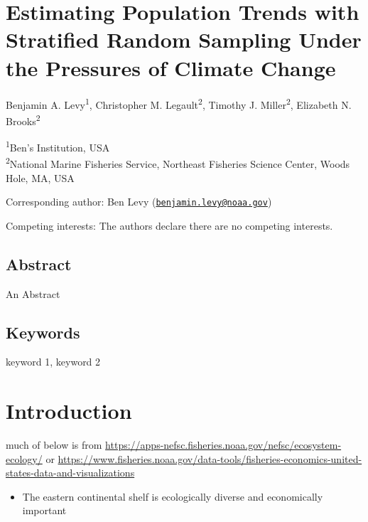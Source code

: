 \documentclass[
  12pt,
]{article}
\author{}
\date{\vspace{-2.5em}}
\providecommand{\tightlist}{%
  \setlength{\itemsep}{0pt}\setlength{\parskip}{0pt}}
\begin{document}
\newpage

\hypertarget{estimating-population-trends-with-stratified-random-sampling-under-the-pressures-of-climate-change}{%
\section{Estimating Population Trends with Stratified Random Sampling Under the Pressures of Climate Change}\label{estimating-population-trends-with-stratified-random-sampling-under-the-pressures-of-climate-change}}

Benjamin A. Levy\textsuperscript{1}, Christopher M. Legault\textsuperscript{2}, Timothy J. Miller\textsuperscript{2}, Elizabeth N. Brooks\textsuperscript{2}

\textsuperscript{1}Ben's Institution, USA\\
\textsuperscript{2}National Marine Fisheries Service, Northeast Fisheries Science Center, Woods Hole, MA, USA

Corresponding author: Ben Levy (\href{mailto:benjamin.levy@noaa.gov}{\nolinkurl{benjamin.levy@noaa.gov}})

Competing interests: The authors declare there are no competing interests.

\newpage

\hypertarget{abstract}{%
\subsection{Abstract}\label{abstract}}

An Abstract

\hypertarget{keywords}{%
\subsection{Keywords}\label{keywords}}

keyword 1, keyword 2

\newpage

\section{Introduction}

much of below is from \url{https://apps-nefsc.fisheries.noaa.gov/nefsc/ecosystem-ecology/}
or
\url{https://www.fisheries.noaa.gov/data-tools/fisheries-economics-united-states-data-and-visualizations}

\begin{itemize}
\tightlist
\item
  The eastern continental shelf is ecologically diverse and economically important
\end{itemize}
\end{document}
